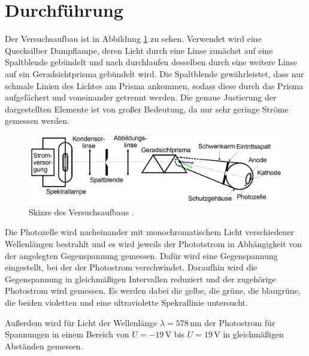 \section{Durchführung}
\label{sec:Durchführung}

Der Versuchsaufbau ist in Abbildung \ref{fig:aufbau} zu sehen. Verwendet wird eine
Quecksilber Dampflampe, deren Licht durch eine Linse zunächst auf eine Spaltblende
gebündelt und nach durchlaufen desselben durch eine weitere Linse auf ein
Geradsichtprisma gebündelt wird. Die Spaltblende gewährleistet, dass nur schmale Linien
des Lichtes am Prisma ankommen, sodass diese durch das Prisma aufgefächert und voneinander getrennt
werden. Die genaue Justierung der dargestellten Elemente ist von großer Bedeutung,
da nur sehr geringe Ströme gemessen werden.

\begin{figure}
  \centering
  \includegraphics[width=\textwidth]{data/aufbau.png}
  \caption{Skizze des Versuchsaufbaus \cite{Versuchsanleitung}.}
  \label{fig:aufbau}
\end{figure}

Die Photozelle wird nacheinander mit monochromatischem Licht verschiedener Wellenlängen
bestrahlt und es wird jeweils der Phototstrom in Abhängigkeit von der angelegten
Gegenspannung gemessen. Dafür wird eine Gegenspannung eingestellt, bei der der
Photostrom verschwindet. Daraufhin wird die Gegenspannung in gleichmäßigen Intervallen
reduziert und der zugehörige Photostrom wird gemessen. Es werden dabei die gelbe,
die grüne, die blaugrüne, die beiden violetten und eine ultraviolette Spekrallinie
untersucht.

Außerdem wird für Licht der Wellenlänge $\lambda=578\,$nm der Photostrom für Spannungen
in einem Bereich von $U=-19\,$V bis $U=19\,$V in gleichmäßigen Abständen gemessen.

